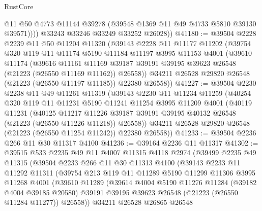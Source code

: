 \begin{lexlean}{RustCore}
\begin{coremodule}
              @11
              @50
              @4773
              @11144
              @39278
              (@39548 @1369 @11 @49 @4733 @5810 @39130 @39571))))
        @33243
        @33246
        @33249
        @33252
        @26028))
@41180 := @39504
    @2228
    @2239
    @11
    @50
    @11204
    @11320
    (@39143
      @2228
      @11
      @11177
      @11202
      (@39754
        @320
        @119
        @11
        @11174
        @5190
        @11184
        @11197
        @3995
        @11153
        @4001
        (@39610
          @11174
          (@39616
            @11161
            @11169
            @39187
            @39191
            @39195
            @39623
            @26548
            (@21223 (@26550 @11169 @11162))
            @26558))
        @34211
        @26528
        @29820
        @26548
        (@21223 (@26550 @11197 @11185))
        @22380
        @26558))
@41227 := @39504
    @2230
    @2238
    @11
    @49
    @11261
    @11319
    (@39143
      @2230
      @11
      @11234
      @11259
      (@40254
        @320
        @119
        @11
        @11231
        @5190
        @11241
        @11254
        @3995
        @11209
        @4001
        (@40119
          @11231
          (@40125
            @11217
            @11226
            @39187
            @39191
            @39195
            @40132
            @26548
            (@21223 (@26550 @11226 @11218))
            @26558))
        @34211
        @26528
        @29820
        @26548
        (@21223 (@26550 @11254 @11242))
        @22380
        @26558))
@41233 := @39504 @2236 @266 @11 @30 @11317 @4100
@41236 := @39164 @2236 @11 @11317
@41302 := @39515
    @533
    @2235
    @49
    @11
    @4007
    @11315
    @4118
    @2974
    (@39499
      @2235
      @49
      @11315
      (@39504
        @2233
        @266
        @11
        @30
        @11313
        @4100
        (@39143
          @2233
          @11
          @11292
          @11311
          (@39754
            @213
            @119
            @11
            @11289
            @5190
            @11299
            @11306
            @3995
            @11268
            @4001
            (@39610
              @11289
              (@39614
                @4004
                @5190
                @11276
                @11284
                (@39182 @4004 @39185 @20580)
                @39191
                @39195
                @39623
                @26548
                (@21223 (@26550 @11284 @11277))
                @26558))
            @34211
            @26528
            @26865
            @26548

\end{coremodule}
\end{lexlean}

